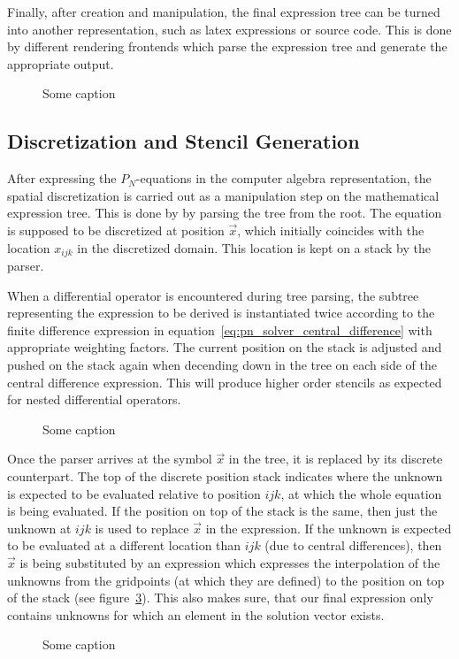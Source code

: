 Finally, after creation and manipulation, the final expression tree can be turned into another representation, such as latex expressions or source code. This is done by different rendering frontends which parse the expression tree and generate the appropriate output.
\begin{figure}[h]
\centering
{}
\caption{Some caption}
\label{fig:pn_math_expression_tree_rendering}
\end{figure}

\subsection{Discretization and Stencil Generation}
\label{sec:pn_stencil_gen}

After expressing the $P_N$-equations in the computer algebra representation, the spatial discretization is carried out as a manipulation step on the mathematical expression tree. This is done by by parsing the tree from the root. The equation is supposed to be discretized at position $\vec{x}$, which initially coincides with the location $x_{ijk}$ in the discretized domain. This location is kept on a stack by the parser.

When a differential operator is encountered during tree parsing, the subtree representing the expression to be derived is instantiated twice according to the finite difference expression in equation~\ref{eq:pn_solver_central_difference} with appropriate weighting factors. The current position on the stack is adjusted and pushed on the stack again when decending down in the tree on each side of the central difference expression. This will produce higher order stencils as expected for nested differential operators.
\begin{figure}[h]
\centering
{}
\caption{Some caption}
\label{fig:pn_discretization_differential}
\end{figure}

Once the parser arrives at the symbol $\vec{x}$ in the tree, it is replaced by its discrete counterpart. The top of the discrete position stack indicates where the unknown is expected to be evaluated relative to position $ijk$, at which the whole equation is being evaluated. If the position on top of the stack is the same, then just the unknown at $ijk$ is used to replace $\vec{x}$ in the expression. If the unknown is expected to be evaluated at a different location than $ijk$ (due to central differences), then $\vec{x}$ is being substituted by an expression which expresses the interpolation of the unknowns from the gridpoints (at which they are defined) to the position on top of the stack (see figure~\ref{fig:pn_discretization_interpolation}). This also makes sure, that our final expression only contains unknowns for which an element in the solution vector exists.
\begin{figure}[h]
\centering
{}
\caption{Some caption}
\label{fig:pn_discretization_interpolation}
\end{figure}

